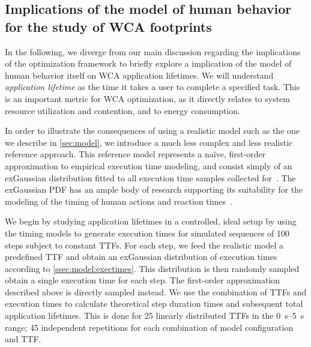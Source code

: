 \subsection{Implications of the model of human behavior for the study of \gls{WCA} footprints}\label{sec:implications:footprint}


In the following, we diverge from our main discussion regarding the implications of the optimization framework to briefly explore a implication of the model of human behavior itself on \gls{WCA} application lifetimes.
We will understand \emph{application lifetime} as the time it takes a user to complete a specified task.
This is an important metric for \gls{WCA} optimization, as it directly relates to system resource utilization and contention, and to energy consumption.

In order to illustrate the consequences of using a realistic model such as the one we describe in \cref{sec:model}, we introduce a much less complex and less realistic reference approach.
This reference model represents a naïve, first-order approximation to empirical execution time modeling, and consist simply of an \gls{exGaussian} distribution fitted to all execution time samples collected for~\cite{olguinmunoz2021impact}.
The \gls{exGaussian} \gls{PDF} has an ample body of research supporting its suitability for the modeling of the timing of human actions and reaction times~\cite{rohrer1994analysis,palmer2011what,marmolejo_ramos2022generalised}.

We begin by studying application lifetimes in a controlled, ideal setup by using the timing models to generate execution times for simulated sequences of \num{100} steps subject to constant \glspl{TTF}.
For each step, we feed the realistic model a predefined \gls{TTF} and obtain an \gls{exGaussian} distribution of execution times according to \cref{ssec:model:exectimes}.
This distribution is then randomly sampled obtain a single execution time for each step.
The first-order approximation described above is directly sampled instead.
We use the combination of \glspl{TTF} and execution times to calculate theoretical step duration times and subsequent total application lifetimes.
This is done for \num{25} linearly distributed \glspl{TTF} in the \SIrange[]{0}{5}{\second} range; \num{45} independent repetitions for each combination of model configuration and \gls{TTF}.

